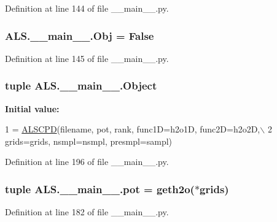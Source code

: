 Definition at line 144 of file \+\_\+\+\_\+main\+\_\+\+\_\+.\+py.

\hypertarget{namespace_a_l_s_1_1____main_____ab3aa61ab51823df019a351f6bb82b138}{
\subsubsection[{Obj}]{\setlength{\rightskip}{0pt plus 5cm}A\+L\+S.\+\_\+\+\_\+main\+\_\+\+\_\+.\+Obj = False}}\label{namespace_a_l_s_1_1____main_____ab3aa61ab51823df019a351f6bb82b138}


Definition at line 145 of file \+\_\+\+\_\+main\+\_\+\+\_\+.\+py.

\hypertarget{namespace_a_l_s_1_1____main_____a610b87b76246245771ea935477540795}{
\subsubsection[{Object}]{\setlength{\rightskip}{0pt plus 5cm}tuple A\+L\+S.\+\_\+\+\_\+main\+\_\+\+\_\+.\+Object}}\label{namespace_a_l_s_1_1____main_____a610b87b76246245771ea935477540795}
{\bfseries Initial value\+:}
\begin{DoxyCode}
1 = \hyperlink{class_a_l_s_1_1_a_l_sclass_1_1_a_l_s_c_p_d}{ALSCPD}(filename, pot, rank, func1D=h2o1D, func2D=h2o2D,\(\backslash\)
2                                     grids=grids, nsmpl=nsmpl, presmpl=sampl)
\end{DoxyCode}


Definition at line 196 of file \+\_\+\+\_\+main\+\_\+\+\_\+.\+py.

\hypertarget{namespace_a_l_s_1_1____main_____ac0e196b18c2c5ce3593885fa2cd7174c}{
\subsubsection[{pot}]{\setlength{\rightskip}{0pt plus 5cm}tuple A\+L\+S.\+\_\+\+\_\+main\+\_\+\+\_\+.\+pot = geth2o($\ast$grids)}}\label{namespace_a_l_s_1_1____main_____ac0e196b18c2c5ce3593885fa2cd7174c}


Definition at line 182 of file \+\_\+\+\_\+main\+\_\+\+\_\+.\+py.

